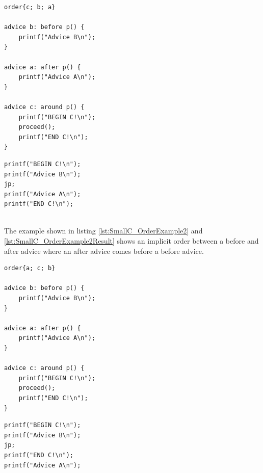 \documentclass[a4paper]{report}
\begin{document}
\begin{minipage}{0.42\textwidth}
\begin{lstlisting}[caption=An example of a non-trivial order., label=lst:SmallC_OrderExample]
order{c; b; a}

advice b: before p() {
	printf("Advice B\n");
}

advice a: after p() {
	printf("Advice A\n");
}

advice c: around p() {
	printf("BEGIN C!\n");
	proceed();
	printf("END C!\n");
}
\end{lstlisting}
\end{minipage}\hfill
\begin{minipage}{0.42\textwidth}
\begin{lstlisting}[caption=The result of the order., label=lst:SmallC_OrderExampleResult]
printf("BEGIN C!\n");
printf("Advice B\n");
jp;
printf("Advice A\n");
printf("END C!\n");
\end{lstlisting}
\end{minipage}\\
The example shown in listing \ref{lst:SmallC_OrderExample2} and \ref{lst:SmallC_OrderExample2Result} shows an implicit order between a before and after advice where an after advice comes before a before advice.\\
\begin{minipage}{0.42\textwidth}
\begin{lstlisting}[caption=An example of a non-trivial order., label=lst:SmallC_OrderExample2]
order{a; c; b}

advice b: before p() {
	printf("Advice B\n");
}

advice a: after p() {
	printf("Advice A\n");
}

advice c: around p() {
	printf("BEGIN C!\n");
	proceed();
	printf("END C!\n");
}
\end{lstlisting}
\end{minipage}\hfill
\begin{minipage}{0.42\textwidth}
\begin{lstlisting}[caption=The result of the order., label=lst:SmallC_OrderExample2Result]
printf("BEGIN C!\n");
printf("Advice B\n");
jp;
printf("END C!\n");
printf("Advice A\n");
\end{lstlisting}
\end{minipage}
\end{document}
